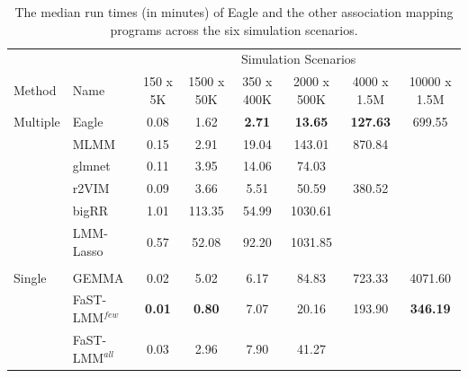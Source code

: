 \documentclass{article}
\begin{document}
\begin{table}
\caption{The median run times (in minutes) of Eagle and the other association mapping programs across the six simulation scenarios. }
\begin{tabular}{llcccccc}
              &           &  \multicolumn{6}{c}{Simulation Scenarios} \\ \cline{3-8}
 Method & Name & 150 x 5K & 1500 x 50K & 350 x 400K & 2000 x 500K & 4000 x 1.5M & 10000 x 1.5M \\ \hline
  Multiple & Eagle 	&	   0.08  &   1.62   &  \bf{2.7}1  &   \bf{13.65}   & \bf{127.63}  &   699.55  \\
               & MLMM 	&	   0.15    &  2.91    & 19.04  &  143.01  &  870.84  &     \\
               & glmnet 	&	  0.11     & 3.95    & 14.06    & 74.03    &        &    \\
               & r2VIM 	&	   0.09    &  3.66    &  5.51    & 50.59    & 380.52  &   \\ 
               & bigRR 	&	    1.01   & 113.35   &  54.99   & 1030.61  &        &     \\
               & LMM-Lasso 	&     0.57  &   52.08 &    92.20  & 1031.85 &           &     \\ \\
Single     &  GEMMA 	&      0.02  &   5.02   &   6.17  &   84.83   & 723.33  & 4071.60 \\
               & FaST-LMM$^{few}$ 	&    \bf{0.01}   &  \bf{0.80}   &   7.07   &  20.16   & 193.90   & \bf{346.19} \\ 
               & FaST-LMM$^{all}$   	&   0.03   & 2.96  &    7.90   &  41.27  &            &   \\ \hline
\end{tabular}

\end{table}
\end{document}

